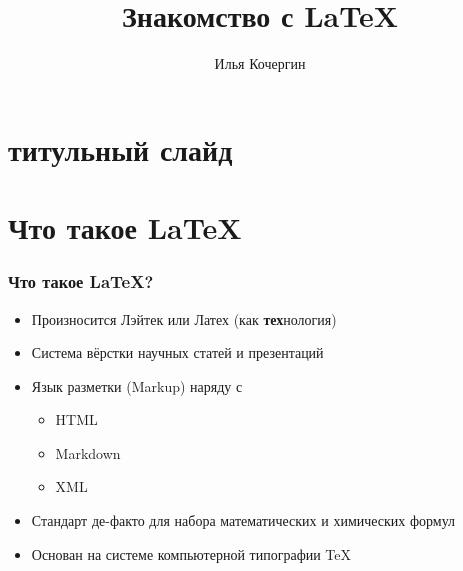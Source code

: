 \documentclass[10pt,pdf,hyperref={unicode}]{beamer}
\title{Знакомство с LaTeX}
\author{Илья Кочергин}
\institute{кафедра экономической информатики}
\begin{document}
    
\section*{титульный слайд}    
    
    
\begin{frame}
\titlepage
\end{frame}

\section{Что такое LaTeX}
\begin{frame}
     \frametitle{Что такое \LaTeX?}
     \begin{itemize}
         \item Произносится Лэйтек или Латех (как \textbf{тех}нология)
         \item Система вёрстки научных статей и презентаций
         \item Язык разметки (Markup) наряду с 
         \begin{itemize}
             \item HTML
             \item Markdown
             \item XML
            \end{itemize}
         \item Стандарт де-факто для набора математических и химических формул
         \item Основан на системе компьютерной типографии \TeX{} 
      \end{itemize}
\end{frame}
\end{document}

